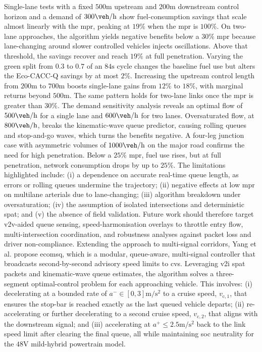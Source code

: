 Single-lane tests with a fixed $500\unit{\metre}$ upstream and $200\unit{\metre}$ downstream control horizon and a demand of $300\unit{\veh\per\hour}$ show fuel-consumption savings that scale almost linearly with the \ac{mpr}, peaking at $19\%$ when the \ac{mpr} is $100\%$. On two-lane approaches, the algorithm yields negative benefits below a $30\%$ \ac{mpr} because lane-changing around slower controlled vehicles injects oscillations. Above that threshold, the savings recover and reach $19\%$ at full penetration. Varying the green split from $0.3$ to $0.7$ of an $84\unit{\second}$ cycle changes the baseline fuel use but alters the Eco-CACC-Q savings by at most $2\%$. Increasing the upstream control length from $200\unit{\metre}$ to $700\unit{\metre}$ boosts single-lane gains from $12\%$ to $18\%$, with marginal returns beyond $500\unit{\metre}$. The same pattern holds for two-lane links once the \ac{mpr} is greater than $30\%$. The demand sensitivity analysis reveals an optimal flow of $500\unit{\veh\per\hour}$ for a single lane and $600\unit{\veh\per\hour}$ for two lanes. Oversaturated flow, at $800\unit{\veh\per\hour}$, breaks the kinematic-wave queue predictor, causing rolling queues and stop-and-go waves, which turns the benefits negative. A four-leg junction case with asymmetric volumes of $1000\unit{\veh\per\hour}$ on the major road confirms the need for high penetration. Below a $25\%$ \ac{mpr}, fuel use rises, but at full penetration, network consumption drops by up to $25\%$. The limitations highlighted include: (i) a dependence on accurate real-time queue length, as errors or rolling queues undermine the trajectory; (ii) negative effects at low \ac{mpr} on multilane arterials due to lane-changing; (iii) algorithm breakdown under oversaturation; (iv) the assumption of isolated intersections and deterministic \ac{spat}; and (v) the absence of field validation. Future work should therefore target \ac{v2v}-aided queue sensing, speed-harmonisation overlays to throttle entry flow, multi-intersection coordination, and robustness analyses against packet loss and driver non-compliance.
\mynewline
Extending the approach to multi-signal corridors, Yang et al. \cite{Yang2021} propose \ac{ecomsq}, which is a modular, queue-aware, multi-signal controller that broadcasts second-by-second advisory speed limits to \acp{cv}. Leveraging \ac{v2i} \ac{spat} packets and kinematic-wave queue estimates, the algorithm solves a three-segment optimal-control problem for each approaching vehicle. This involves: (i) decelerating at a bounded rate of $a^{-}\in[0,3]\unit{\metre\per\second\squared}$ to a cruise speed, $v_{\mathrm c,1}$, that ensures the stop-bar is reached exactly as the last queued vehicle departs; (ii) re-accelerating or further decelerating to a second cruise speed, $v_{\mathrm c,2}$, that aligns with the downstream signal; and (iii) accelerating at $a^{+}\le 2.5\unit{\metre\per\second\squared}$ back to the link speed limit after clearing the final queue, all while maintaining \ac{soc} neutrality for the $48\unit{\volt}$ mild-hybrid powertrain model.
